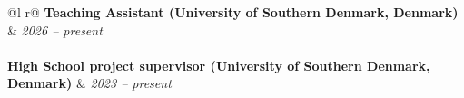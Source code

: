 \documentclass[a4paper, 11pt]{article}
\begin{document}
\begin{tabularx}{\linewidth}{ @{}l r@{} }
\textbf{Teaching Assistant \small\normalfont (University of Southern Denmark, Denmark)} & \hfill \textit{2026 -- present} \\ [3.75pt]
     \\ [3.75pt]
\textbf{High School project supervisor \small\normalfont (University of Southern Denmark, Denmark)} & \hfill \textit{2023 -- present}
\end{tabularx}
\vspace{0.1cm}
\end{document}
